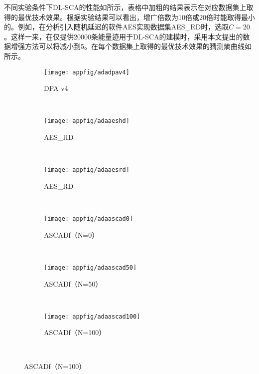 {	不同实验条件下DL-SCA的性能如所示，表格中加粗的结果表示在对应数据集上取得的最优技术效果。根据实验结果可以看出，增广倍数为10倍或20倍时能取得最小的\chenggongtiaoshu 。例如，在分析引入随机延迟的软件AES实现数据集AES\_RD时，选取$C=20$。这样一来，在仅提供20000条能量迹用于DL-SCA的建模时，采用本文提出的数据增强方法可以将\chenggongtiaoshu 减小到5。在每个数据集上取得的最优技术效果的猜测熵曲线如所示。
	
	\begin{figure}[!h]
		\centering
		\begin{subfigure}[b]{\trif\textwidth}
			\texttt{[image: appfig/adadpav4]}
			\caption{DPA v4}
			\label{fig:adadpav4}
		\end{subfigure}%
		~%
		\begin{subfigure}[b]{\trif\textwidth}
			\texttt{[image: appfig/adaaeshd]}
			\caption{AES\_HD}
			\label{fig:adaaeshd}
		\end{subfigure}
		~%
		\begin{subfigure}[b]{\trif\textwidth}
			\texttt{[image: appfig/adaaesrd]}
			\caption{AES\_RD}
			\label{fig:adaaesrd}
		\end{subfigure}
		\\%
		\begin{subfigure}[b]{\trif\textwidth}
			\texttt{[image: appfig/adaascad0]}
			\caption{ASCADf（N=0）}
			\label{fig:adaascad0}
		\end{subfigure}%
		~%
		\begin{subfigure}[b]{\trif\textwidth}
			\texttt{[image: appfig/adaascad50]}
			\caption{ASCADf（N=50）}
			\label{fig:adaascad50}
		\end{subfigure}
		~%
		\begin{subfigure}[b]{\trif\textwidth}
			\texttt{[image: appfig/adaascad100]}
			\caption{ASCADf（N=100）}
			\label{fig:adaascad100}
		\end{subfigure}
		\\%
		\label{appfig:adadlsca}
	\end{figure}
	
}
